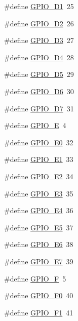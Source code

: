 \begin{DoxyCompactItemize}
\item 
\#define \hyperlink{gpio-1284p_8h_aa17fd072d880a90794a9de384d5d4b4c}{G\+P\+I\+O\+\_\+\+D1}~25
\item 
\#define \hyperlink{gpio-1284p_8h_a8e2e03cace745ded0bf7e6b834069aa2}{G\+P\+I\+O\+\_\+\+D2}~26
\item 
\#define \hyperlink{gpio-1284p_8h_a77c833f7e72952b88e27165562319879}{G\+P\+I\+O\+\_\+\+D3}~27
\item 
\#define \hyperlink{gpio-1284p_8h_aa853bc56ae73df4b4167011a80a1cc44}{G\+P\+I\+O\+\_\+\+D4}~28
\item 
\#define \hyperlink{gpio-1284p_8h_a6dd18400ebac68e0d985f00bf8e3cb93}{G\+P\+I\+O\+\_\+\+D5}~29
\item 
\#define \hyperlink{gpio-1284p_8h_a69d6ec684f6ad05bd964b0d7b1a54707}{G\+P\+I\+O\+\_\+\+D6}~30
\item 
\#define \hyperlink{gpio-1284p_8h_a942795d401dde363d3b5a581a807cdaa}{G\+P\+I\+O\+\_\+\+D7}~31
\item 
\#define \hyperlink{gpio-1284p_8h_ab00bc002e70bc71dc912479c4b8db95c}{G\+P\+I\+O\+\_\+E}~4
\item 
\#define \hyperlink{gpio-1284p_8h_a20705091fe57443bf2bf334fa7a94bb0}{G\+P\+I\+O\+\_\+\+E0}~32
\item 
\#define \hyperlink{gpio-1284p_8h_aef4ec795ce33c6cefd144aac406f4ff4}{G\+P\+I\+O\+\_\+\+E1}~33
\item 
\#define \hyperlink{gpio-1284p_8h_a007ee8df01119da3242fcb4893a049a2}{G\+P\+I\+O\+\_\+\+E2}~34
\item 
\#define \hyperlink{gpio-1284p_8h_aca4a0027232bf1b34938f00eecd6f1ca}{G\+P\+I\+O\+\_\+\+E3}~35
\item 
\#define \hyperlink{gpio-1284p_8h_aa0c8992d072926cbd0717f87db80bf19}{G\+P\+I\+O\+\_\+\+E4}~36
\item 
\#define \hyperlink{gpio-1284p_8h_a0d195d7e65cec14be099ac35ca445b42}{G\+P\+I\+O\+\_\+\+E5}~37
\item 
\#define \hyperlink{gpio-1284p_8h_a4e8d2879a22e934140432204ddd20d74}{G\+P\+I\+O\+\_\+\+E6}~38
\item 
\#define \hyperlink{gpio-1284p_8h_a862823c2ff19060a5060a160aeb80af2}{G\+P\+I\+O\+\_\+\+E7}~39
\item 
\#define \hyperlink{gpio-1284p_8h_addb630c65c8c909c54732c306c1297a2}{G\+P\+I\+O\+\_\+F}~5
\item 
\#define \hyperlink{gpio-1284p_8h_a05a865e875852fa7d3260b5979bffd6a}{G\+P\+I\+O\+\_\+\+F0}~40
\item 
\#define \hyperlink{gpio-1284p_8h_a6792cfe392834ddec98b381aa8e5fb49}{G\+P\+I\+O\+\_\+\+F1}~41

\end{DoxyCompactItemize}
